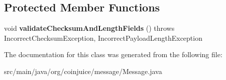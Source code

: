 \subsection*{Protected Member Functions}
\begin{DoxyCompactItemize}
\item 
\hypertarget{classorg_1_1coinjuice_1_1message_1_1_message_af58273e4b14385cb958c976a6e1fcef7}{void {\bfseries validate\-Checksum\-And\-Length\-Fields} ()  throws Incorrect\-Checksum\-Exception, Incorrect\-Payload\-Length\-Exception }\label{classorg_1_1coinjuice_1_1message_1_1_message_af58273e4b14385cb958c976a6e1fcef7}

\end{DoxyCompactItemize}


The documentation for this class was generated from the following file\-:\begin{DoxyCompactItemize}
\item 
src/main/java/org/coinjuice/message/Message.\-java\end{DoxyCompactItemize}
